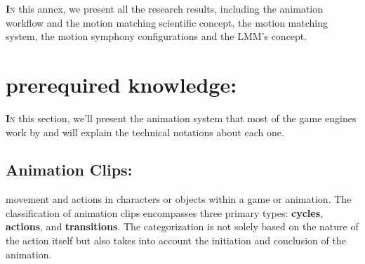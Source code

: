 \documentclass[12pt]{book}
\begin{document}
\lettrine[findent=1pt]{\textbf{I}}{n} this annex, we present all the research results, including the animation workflow and the motion matching scientific concept, the motion matching system, the motion symphony configurations and the LMM's concept.      

\label{appendix:state}
\section{prerequired knowledge:}
\label{appendix:state}
\lettrine[findent=1pt]{\textbf{I}}{n} this section, we'll present the animation system that most of the game engines work by and will explain the technical notations about each one. 
\subsection{Animation Clips:}
movement and actions in characters or objects within a game or animation. The
classification of animation clips encompasses three primary types: \textbf{cycles}, \textbf{actions}, and
\textbf{transitions}. The categorization is not solely based on the nature of the action itself but also takes
into account the initiation and conclusion of the animation.
\end{document}
